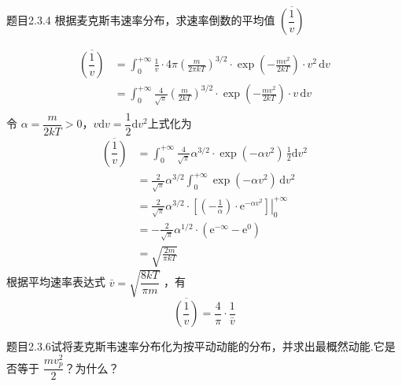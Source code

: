 \begin{question}{题目2.3.4}
    根据麦克斯韦速率分布，求速率倒数的平均值 $\overline{\left(\dfrac{1}{v}\right)}$
\end{question}

\begin{solution}
    $$
        \begin{aligned}
            \overline{\left(\dfrac{1}{v}\right)}
             & = \int_0^{+\infty} \frac{1}{v} \cdot 4\pi \left(\frac{m}{2\pi kT}\right)^{3/2} \cdot \exp\left(-\frac{mv^2}{2kT}\right) \cdot v^2 \,\mathrm{d}v \\
             & = \int_0^{+\infty} \frac{4}{\sqrt{\pi}}\left(\frac{m}{2kT}\right)^{3/2} \cdot \exp\left(-\frac{mv^2}{2kT}\right) \cdot v \,\mathrm{d}v          \\
        \end{aligned}
    $$
    令 $\alpha = \dfrac{m}{2kT}>0$，$v\mathrm{d}v = \dfrac{1}{2}\mathrm{d}v^2$上式化为
    $$
        \begin{aligned}
            \overline{\left(\dfrac{1}{v}\right)}
             & = \int_0^{+\infty} \frac{4}{\sqrt{\pi}} \alpha^{3/2}  \cdot \exp(-\alpha v^2) \, \frac{1}{2}\mathrm{d}v^2                                      \\
             & = \frac{2}{\sqrt{\pi}}\alpha^{3/2} \int_0^{+\infty} \exp(-\alpha v^2) \,\mathrm{d}v^2                                                          \\
             & = \frac{2}{\sqrt{\pi}}\alpha^{3/2} \cdot \left.\left[\left(-\frac{1}{\alpha}\right) \cdot \mathrm{e}^{-\alpha v^2}\right]\right|_{0}^{+\infty} \\
             & = -\frac{2}{\sqrt{\pi}}\alpha^{1/2} \cdot (\mathrm{e}^{-\infty}-\mathrm{e}^0)                                                                  \\
             & = \sqrt{\frac{2m}{\pi kT}}
        \end{aligned}
    $$
    根据平均速率表达式 $\bar{v} = \sqrt{\dfrac{8kT}{\pi m}}$ ，有
    $$
        \overline{\left(\dfrac{1}{v}\right)} = \frac{4}{\pi} \cdot \frac{1}{\bar{v}}
    $$
\end{solution}

\begin{question}{题目2.3.6}试将麦克斯韦速率分布化为按平动动能的分布，并求出最概然动能.它是否等于 $\dfrac{mv_p^2}{2}$？为什么？
\end{question}

